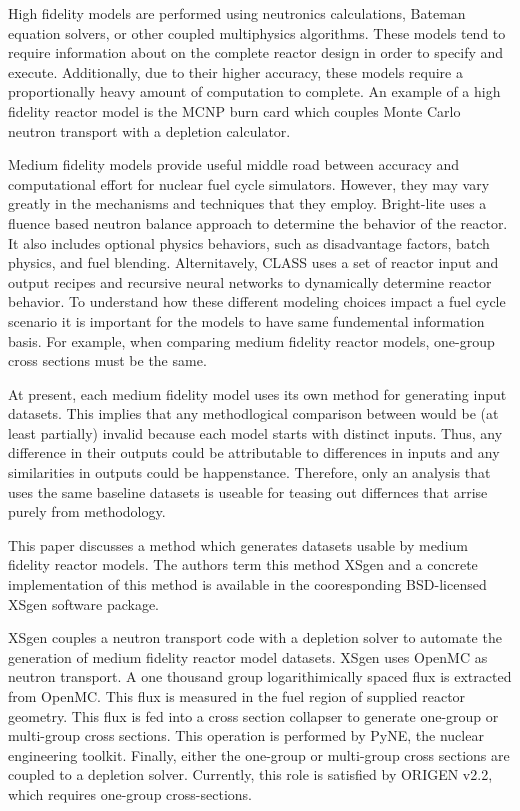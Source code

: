 \documentclass{article}
\begin{document}
High fidelity models are performed using neutronics calculations, Bateman
equation\cite{bateman1910, bateman} solvers, or other coupled multiphysics algorithms. These models tend
to require information about on the complete reactor design in order to specify and execute.
Additionally, due to their higher accuracy, these models require a proportionally heavy amount
of computation to complete. An example of a high fidelity reactor model is the
MCNP\cite{mcnp5monte} burn card which couples Monte Carlo neutron transport with a depletion
calculator.

Medium fidelity models provide useful middle road between accuracy and computational effort
for nuclear fuel cycle simulators. However, they may vary greatly in the mechanisms and
techniques that they employ. Bright-lite uses a fluence based neutron balance approach to
determine the behavior of the reactor. It also includes optional physics behaviors, such as
disadvantage factors, batch physics, and fuel blending. Alternitavely, CLASS uses a set of
reactor input and output recipes and recursive neural networks\cite{classneural} to dynamically determine
reactor behavior. To understand how these different modeling choices impact a fuel cycle
scenario it is important for the models to have same fundemental information basis.
For example, when comparing medium fidelity reactor models, one-group cross sections
must be the same.

At present, each medium fidelity model uses its own method for generating input datasets.
This implies that any methodlogical comparison between would be (at least partially) invalid
because each model starts with distinct inputs. Thus, any difference in their outputs
could be attributable to differences in inputs and any similarities in outputs could be
happenstance. Therefore, only an analysis that uses the same baseline datasets
is useable for teasing out differnces that arrise purely from methodology.

This paper discusses a method which generates datasets usable by medium fidelity reactor models.
The authors term this method XSgen and a concrete implementation of this method is available
in the cooresponding BSD-licensed XSgen software package.

XSgen couples a neutron transport code with a depletion solver to automate the generation of
medium fidelity reactor model datasets. XSgen uses OpenMC\cite{openmc} as neutron transport.
A one thousand group logarithimically spaced flux is extracted from OpenMC. This flux is
measured in the fuel region of supplied reactor geometry. This flux is fed into a cross
section collapser to generate one-group or multi-group cross sections. This operation is
performed by PyNE\cite{pyne}, the nuclear engineering toolkit. Finally, either the
one-group or multi-group cross sections are coupled to a depletion solver. Currently, this
role is satisfied by ORIGEN v2.2\cite{origen2}, which requires one-group cross-sections.
\end{document}
